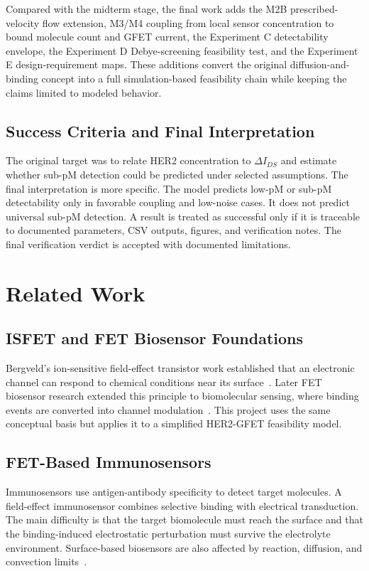 ﻿\documentclass[12pt,a4paper,oneside]{report}
\begin{document}
Compared with the midterm stage, the final work adds the M2B prescribed-velocity flow extension, M3/M4 coupling from local sensor concentration to bound molecule count and GFET current, the Experiment C detectability envelope, the Experiment D Debye-screening feasibility test, and the Experiment E design-requirement maps. These additions convert the original diffusion-and-binding concept into a full simulation-based feasibility chain while keeping the claims limited to modeled behavior.

\section{Success Criteria and Final Interpretation}
The original target was to relate HER2 concentration to $\Delta I_{DS}$ and estimate whether sub-pM detection could be predicted under selected assumptions. The final interpretation is more specific. The model predicts low-pM or sub-pM detectability only in favorable coupling and low-noise cases. It does not predict universal sub-pM detection. A result is treated as successful only if it is traceable to documented parameters, CSV outputs, figures, and verification notes. The final verification verdict is accepted with documented limitations.

\chapter{Related Work}

\section{ISFET and FET Biosensor Foundations}
Bergveld's ion-sensitive field-effect transistor work established that an electronic channel can respond to chemical conditions near its surface~\cite{Bergveld1970,bergveld1972}. Later FET biosensor research extended this principle to biomolecular sensing, where binding events are converted into channel modulation~\cite{Stern2007}. This project uses the same conceptual basis but applies it to a simplified HER2-GFET feasibility model.

\section{FET-Based Immunosensors}
Immunosensors use antigen-antibody specificity to detect target molecules. A field-effect immunosensor combines selective binding with electrical transduction. The main difficulty is that the target biomolecule must reach the surface and that the binding-induced electrostatic perturbation must survive the electrolyte environment. Surface-based biosensors are also affected by reaction, diffusion, and convection limits~\cite{Squires2008}.
\end{document}
